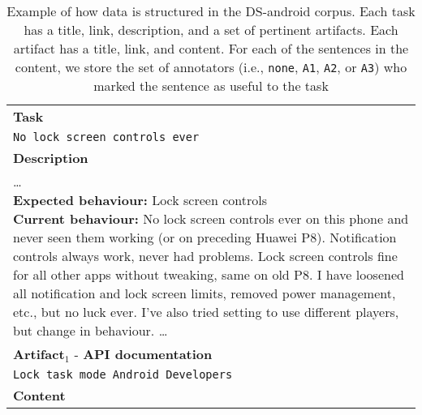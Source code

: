 \begin{landscape}
\begin{table}
\centering        
\caption{Example of how data is structured in the \acs{DS-android} corpus. Each task has a  title, link, description, and a set of pertinent artifacts. Each artifact has a title, link, and content. For each of the sentences in the content, we store the set of annotators (i.e., \texttt{none}, \texttt{A1}, \texttt{A2}, or \texttt{A3}) who marked the sentence as useful to the task}
\label{tbl:corpus-data-structure}    
\begin{scriptsize}
\begin{tabular}{cl}
\hline
\multicolumn{2}{l}{\cellcolor{lightgray}
    \textbf{Task}
}
\\
\multicolumn{2}{l}{\hspace{3mm}
\parbox[l][0.7cm][c]{16cm}{
    \texttt{No lock screen controls ever
}}}
\href{https://github.com/AntennaPod/AntennaPod/issues/3578}{link}
\\
\multicolumn{2}{l}{\cellcolor{lightgray}
    \textbf{Description}
}
\\
\multicolumn{2}{l}{
\hspace{3mm}
\parbox[l][2.5cm][c]{21cm}{
{\ttfamily
    \ldots
    \\
    \textbf{Expected behaviour:} Lock screen controls
    \\
    \textbf{Current behaviour:} No lock screen controls ever on this phone and never seen them working (or on preceding Huawei P8). Notification controls always work, never had problems. Lock screen controls fine for all other apps without tweaking, same on old P8. I have loosened all notification and lock screen limits, removed power management, etc., but no luck ever. I've also tried setting to use different players, but change in behaviour. \ldots
}}}
\\
\hline
\multicolumn{2}{l}{\cellcolor{lightgray}
    \textbf{Artifact}$_1$ - \textbf{API documentation}}
\\
\multicolumn{2}{l}{\hspace{3mm}
\parbox[l][0.7cm][c]{16cm}{
    \texttt{Lock task mode Android Developers
}}}
\href{https://developer.android.com/work/dpc/dedicated-devices/lock-task-mode}{link}
\\
\multicolumn{2}{l}{\cellcolor{lightgray}
    \textbf{Content}}
\\

\end{tabular}
\end{scriptsize}
\end{table}
\end{landscape}
